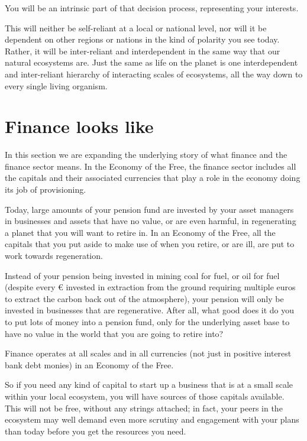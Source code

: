 You will be an intrinsic part of that decision process, representing your interests.


This will neither be self-reliant at a local or national level, nor will it be dependent on other regions or nations in the kind of polarity you see today. Rather, it will be inter-reliant and interdependent in the same way that our natural ecosystems are. Just the same as life on the planet is one interdependent and inter-reliant hierarchy of interacting scales of ecosystems, all the way down to every single living organism. 




\section{Finance looks like}
In this section we are expanding the underlying story of what finance and the finance sector means. In the Economy of the Free, the finance sector includes all the capitals and their associated currencies that play a role in the economy doing its job of provisioning.


Today, large amounts of your pension fund  are invested by your asset managers in businesses and assets that have no value, or are even harmful, in regenerating a planet that you will want to retire in. In an Economy of the Free, all the capitals that you put aside to make use of when you retire, or are ill, are put to work towards regeneration. 


Instead of your pension being invested in mining coal for fuel, or oil for fuel (despite every \euro{} invested in extraction from the ground requiring multiple euros to extract the carbon back out of the atmosphere), your pension will only be invested in businesses that are regenerative. After all, what good does it do you to put lots of money into a pension fund, only for the underlying asset base to have no value in the world that you are going to retire into? 


Finance operates at all scales and in all currencies (not just in positive interest bank debt monies) in an Economy of the Free. 


So if you need any kind of capital to start up a business that is at a small scale within your local ecosystem, you will have sources of those capitals available. This will not be free, without any strings attached; in fact, your peers in the ecosystem may well demand even more scrutiny and engagement with your plans than today before you get the resources you need.


